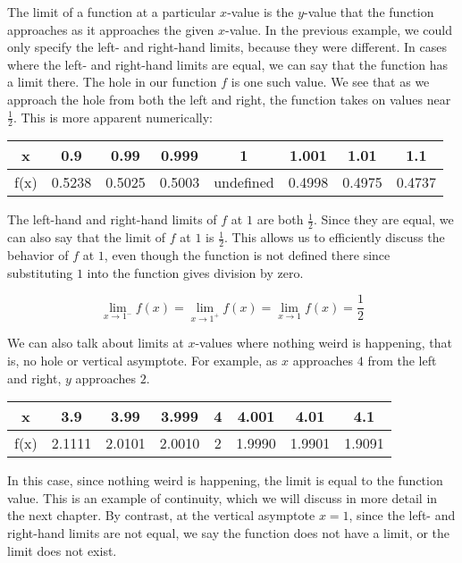 The limit of a function at a particular $ x $-value is the $ y $-value that the 
function approaches as it approaches the given $ x $-value. In the previous 
example, we could only specify the left- and right-hand limits, because they were 
different. In cases where the left- and right-hand limits are equal, we can say 
that the function has a limit there. The hole in our function $ f $ is one such 
value. We see that as we approach the hole from both the left and right, the 
function takes on values near $\frac{1}{2}$. This is more apparent numerically:


\begin{center}
\begin{tabular}{ |c|c|c|c|c|c|c|c| } 
 \hline
 x & 0.9 & 0.99 & 0.999 & 1 & 1.001 & 1.01 & 1.1 \\ 
 \hline
 f(x) & 0.5238 & 0.5025 & 0.5003 & undefined & 0.4998 & 0.4975 & 0.4737 \\ 
 \hline
\end{tabular}
\end{center}

The left-hand and right-hand limits of $ f $ at $ 1 $ are both $\frac{1}{2}$. Since 
they are equal, we can also say that the limit of $ f $ at $ 1 $ is $\frac{1}{2}$. 
This allows us to efficiently discuss the behavior of $ f $ at $ 1 $, even though 
the function is not defined there since substituting $ 1 $ into the function gives 
division by zero.

$$ \lim_{x \rightarrow 1^-} f(x) = \lim_{x \rightarrow 1^+} f(x) = \lim_{x \rightarrow 1} f(x) = \frac{1}{2} $$

We can also talk about limits at $x$-values where nothing weird is happening, that 
is, no hole or vertical asymptote. For example, as $x$ approaches $4$ from the left 
and right, $y$ approaches $2$.

\begin{center}
\begin{tabular}{ |c|c|c|c|c|c|c|c| } 
 \hline
 x & 3.9 & 3.99 & 3.999 & 4 & 4.001 & 4.01 & 4.1 \\ 
 \hline
 f(x) & 2.1111 & 2.0101 & 2.0010 & 2 & 1.9990 & 1.9901 & 1.9091 \\ 
 \hline
\end{tabular}
\end{center}

In this case, since nothing weird is happening, the limit is equal to the function 
value. This is an example of continuity, which we will discuss in more detail in 
the next chapter. By contrast, at the vertical asymptote $ x = 1 $, since the left- 
and right-hand limits are not equal, we say the function does not have a limit, or 
the limit does not exist.

